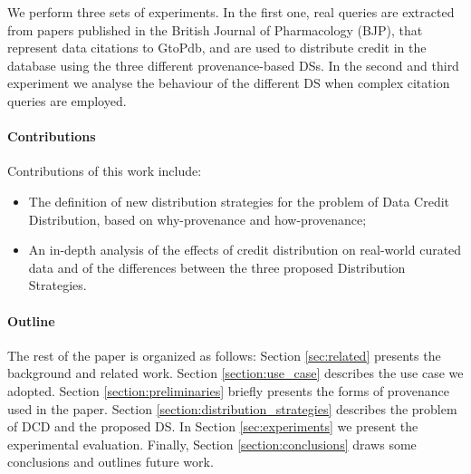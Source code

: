 We perform three sets of experiments. In the first one, real queries are extracted from papers published in the British Journal of Pharmacology (BJP), that represent data citations to GtoPdb, and are used to distribute credit in the database using the three different provenance-based DSs. 
In the second and third experiment we analyse the behaviour of the different DS when  complex citation queries are employed.


\paragraph{\textbf{Contributions}} 
Contributions of this work include:
\begin{itemize}
    \item The definition of new distribution strategies for the problem of Data Credit Distribution, based on why-provenance and how-provenance;
    \item An in-depth analysis of the effects of credit distribution on real-world curated data and of the differences between the three proposed Distribution Strategies.
\end{itemize}

\paragraph{\textbf{Outline}} The rest of the paper is organized as follows:
Section \ref{sec:related} presents the background and related work. Section \ref{section:use_case} describes the use case we adopted. Section \ref{section:preliminaries} briefly presents the forms of provenance used in the paper.  Section \ref{section:distribution_strategies} describes the problem of DCD and the proposed DS.  In Section \ref{sec:experiments} we present the experimental evaluation. Finally, Section \ref{section:conclusions} draws some conclusions and outlines future work.



 
